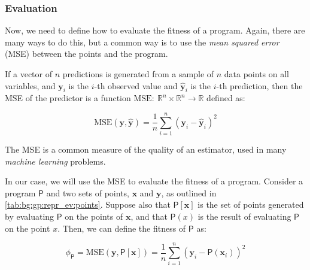 \subsubsection{Evaluation}
\label{sec:bg:gp:repr_ev:eval}
  Now, we need to define how to evaluate the fitness of a program.
  Again, there are many ways to do this, but a common way is to use the
  \emph{mean squared error} (MSE) between the points and the program.

  \begin{definition}
  \label{def:mse}
    If a vector of \(n\) predictions is generated from a sample of \(n\) data
    points on all variables, and \(\mathbf{y}_i\) is the \(i\)-th observed value
    and \(\hat{\mathbf{y}}_i\) is the \(i\)-th prediction, then the MSE of the 
    predictor is a function \(\mathrm{MSE}:\: \mathbb{R}^n \times \mathbb{R}^n
    \to \mathbb{R}\) defined as:

    \begin{equation}
      \label{eq:mse}
      \mathrm{MSE}(\mathbf{y}, \hat{\mathbf{y}}) 
        = \frac{1}{n} \sum_{i=1}^{n} (\mathbf{y}_i - \hat{\mathbf{y}}_i)^2
    \end{equation}
  \end{definition}

  The MSE is a common measure of the quality of an estimator, used in many
  \textit{machine learning} problems.

  In our case, we will use the MSE to evaluate the fitness of a program.
  Consider a program \(\mathsf{P}\) and two sets of points, \(\mathbf{x}\) and 
  \(\mathbf{y}\), as outlined in 
  \vref{tab:bg:gp:repr_ev:points}.
  Suppose also that \(\mathsf{P}[\mathbf{x}]\) is the set of points generated
  by evaluating \(\mathsf{P}\) on the points of \(\mathbf{x}\), and that
  \(\mathsf{P}(x)\) is the result of evaluating \(\mathsf{P}\) on the point
  \(x\).
  Then, we can define the fitness of \(\mathsf{P}\) as:

  \begin{equation}
  \label{eq:bg:gp:repr_ev:fitness}
    \phi_\mathsf{P} = \mathrm{MSE}(\mathbf{y}, \mathsf{P}[\mathbf{x}])
      = \frac{1}{n} \sum_{i=1}^{n} (\mathbf{y}_i - \mathsf{P}(\mathbf{x}_i))^2
  \end{equation}

